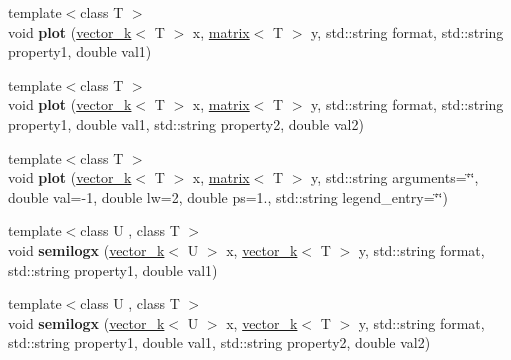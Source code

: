 \begin{DoxyCompactItemize}
\item 
\hypertarget{classkeycpp_1_1_figure_a83d16db4e568f76cf480a7b88d603bd5}{{\footnotesize template$<$class T $>$ }\\void {\bfseries plot} (\hyperlink{classkeycpp_1_1vector__k}{vector\-\_\-k}$<$ T $>$ x, \hyperlink{classkeycpp_1_1matrix}{matrix}$<$ T $>$ y, std\-::string format, std\-::string property1, double val1)}\label{classkeycpp_1_1_figure_a83d16db4e568f76cf480a7b88d603bd5}

\item 
\hypertarget{classkeycpp_1_1_figure_a53ceddd520e6d9ad9bd1f3a5aa4bf8d5}{{\footnotesize template$<$class T $>$ }\\void {\bfseries plot} (\hyperlink{classkeycpp_1_1vector__k}{vector\-\_\-k}$<$ T $>$ x, \hyperlink{classkeycpp_1_1matrix}{matrix}$<$ T $>$ y, std\-::string format, std\-::string property1, double val1, std\-::string property2, double val2)}\label{classkeycpp_1_1_figure_a53ceddd520e6d9ad9bd1f3a5aa4bf8d5}

\item 
\hypertarget{classkeycpp_1_1_figure_ab74716ad7453b9305e76dc0c79c39923}{{\footnotesize template$<$class T $>$ }\\void {\bfseries plot} (\hyperlink{classkeycpp_1_1vector__k}{vector\-\_\-k}$<$ T $>$ x, \hyperlink{classkeycpp_1_1matrix}{matrix}$<$ T $>$ y, std\-::string arguments=\char`\"{}\char`\"{}, double val=-\/1, double lw=2, double ps=1., std\-::string legend\-\_\-entry=\char`\"{}\char`\"{})}\label{classkeycpp_1_1_figure_ab74716ad7453b9305e76dc0c79c39923}

\item 
\hypertarget{classkeycpp_1_1_figure_a663bc64182ce6a0ea4fb77d749a26ca5}{{\footnotesize template$<$class U , class T $>$ }\\void {\bfseries semilogx} (\hyperlink{classkeycpp_1_1vector__k}{vector\-\_\-k}$<$ U $>$ x, \hyperlink{classkeycpp_1_1vector__k}{vector\-\_\-k}$<$ T $>$ y, std\-::string format, std\-::string property1, double val1)}\label{classkeycpp_1_1_figure_a663bc64182ce6a0ea4fb77d749a26ca5}

\item 
\hypertarget{classkeycpp_1_1_figure_a0d7cec066cb7027166ea1adae6fd5909}{{\footnotesize template$<$class U , class T $>$ }\\void {\bfseries semilogx} (\hyperlink{classkeycpp_1_1vector__k}{vector\-\_\-k}$<$ U $>$ x, \hyperlink{classkeycpp_1_1vector__k}{vector\-\_\-k}$<$ T $>$ y, std\-::string format, std\-::string property1, double val1, std\-::string property2, double val2)}\label{classkeycpp_1_1_figure_a0d7cec066cb7027166ea1adae6fd5909}


\end{DoxyCompactItemize}
